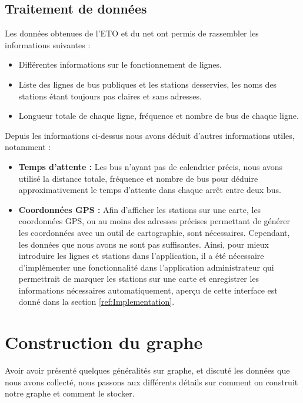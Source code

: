 \subsection{Traitement de données}
Les données obtenues de l'ETO et du net ont permis de rassembler les informations suivantes :
\begin{itemize}
	\item Différentes informations sur le fonctionnement de lignes.
	\item Liste des lignes de bus publiques et les stations desservies, les noms des stations étant toujours pas claires et sans adresses.
	\item Longueur totale de chaque ligne, fréquence et nombre de bus de chaque ligne.\newline 
\end{itemize}

Depuis les informations ci-dessus nous avons déduit d'autres informations utiles, notamment :

\begin{itemize}
	\item \textbf{Temps d'attente : } Les bus n'ayant pas de calendrier précis, nous avons utilisé la distance totale, fréquence et nombre de bus pour déduire approximativement le temps d'attente dans chaque arrêt entre deux bus.
	\item \textbf{Coordonnées GPS :} Afin d'afficher les stations sur une carte, les coordonnées GPS, ou au moins des adresses précises permettant de générer les coordonnées avec un outil de cartographie, sont nécessaires. Cependant, les données que nous avons ne sont pas suffisantes. 
	Ainsi, pour mieux introduire les lignes et stations dans l'application, il a été nécessaire d'implémenter une fonctionnalité dans l'application administrateur qui permettrait de marquer les stations sur une carte et enregistrer les informations nécessaires automatiquement, aperçu de cette interface est donné dans la section \ref{ref:Implementation}.
\end{itemize}

	
\section{Construction du graphe}
Avoir avoir présenté quelques généralités sur graphe, et discuté les données que nous avons collecté, nous passons aux différents détails sur comment on construit notre graphe et comment le stocker.
